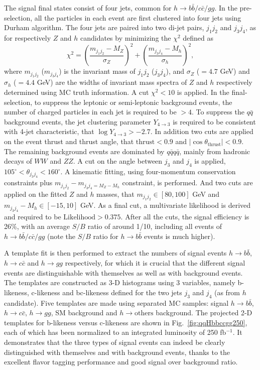 The signal final states consist of four jets, common for $h\to b\bar{b}/c\bar{c}/gg$. 
In the pre-selection, all the particles
in each event are first clustered into four jets using Durham algorithm. The
four jets are paired into two di-jet pairs, $j_1j_2$ and $j_3j_4$, 
as for respectively $Z$ and $h$ candidates by minimizing the $\chi^2$ defined as 
$$\chi^2=(\frac{m_{j_1j_2}-M_Z}{\sigma_Z})^2+(\frac{m_{j_3j_4}-M_h}{\sigma_h})^2,$$
where $m_{j_1j_2}$ ($m_{j_3j_4}$) is the invariant mass of $j_1j_2$ ($j_3j_4$),
and $\sigma_Z$ ($=4.7$ GeV) and $\sigma_h$ ($=4.4$ GeV) are the widths
of invariant mass spectra of $Z$ and $h$ respectively determined using MC truth information. 
A cut $\chi^2<10$ is applied. In the final-selection, to suppress the leptonic or 
semi-leptonic background events, the number of
charged particles in each jet is required to be $> 4$. To suppress the $q\bar{q}$
background events, the jet clustering parameter $Y_{4\to3}$ 
is required to be consistent with 4-jet characteristic, that $\log Y_{4\to 3}>-2.7$.
In addition two cuts are applied on the event thrust and thrust angle,
that $\mathrm{thrust}<0.9$ and $|\cos\theta_{\mathrm{thrust}}|<0.9$. The remaining
background events are dominated by $q\bar{q}q\bar{q}$, mainly from hadronic decays of $WW$ and $ZZ$. 
A cut on the angle between $j_3$ and $j_4$ is applied, $105^\circ<\theta_{j_3j_4}<160^\circ$.
A kinematic fitting, using four-momentum conservation constraints plus 
$m_{j_1j_2}-m_{j_3j_4=M_Z-M_h}$ constraint, is performed. And two cuts are
applied on the fitted $Z$ and $h$ masses, 
that $m_{j_1j_2}\in[80,100]$ GeV and $m_{j_3j_4}-M_h\in[-15,10]$ GeV. As a final cut,
a multivariate likelihood is derived and required to be $\mathrm{Likelihood}>0.375$.
After all the cuts, the signal efficiency is 26\%, with an average $S/B$ ratio of around 1/10, 
including all events of $h\to b\bar{b}/c\bar{c}/gg$ (note the $S/B$ ratio for $h\to b\bar{b}$ events
is much higher). 

A template fit is then performed to extract the numbers of signal events $h\to b\bar{b}$,
$h\to c\bar{c}$ and $h\to gg$ respectively, 
for which it is crucial that the different signal events are distinguishable with themselves 
as well as with background events. 
The templates are constructed as 3-D histograms using
3 variables, namely b-likeness, c-likeness and bc-likeness defined for the two jets 
$j_3$ and $j_4$ (as from $h$ candidate). Five templates are made using separated MC samples:
signal $h\to b\bar{b}$, $h\to c\bar{c}$, $h\to gg$, SM background and $h\to\mathrm{others}$ background. 
The projected 2-D templates for b-likeness versus c-likeness are shown in Fig.~\ref{fig:qqHbbccgg250}, 
each of which has been normalized to an integrated luminosity of 250 fb$^{-1}$.
It demonstrates that the three types of signal events can indeed be clearly distinguished
with themselves and with background events, thanks to
the excellent flavor tagging performance and good signal over background ratio.

